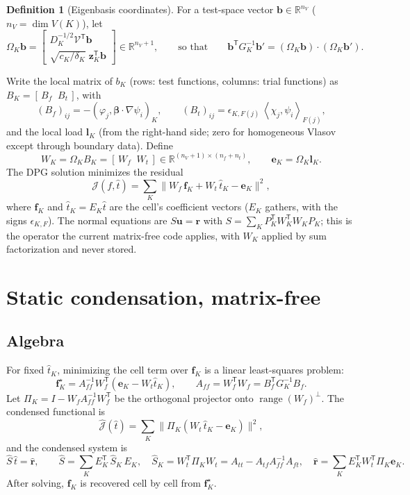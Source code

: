 \documentclass[11pt]{article}
\theoremstyle{remark}
\theoremstyle{definition}
\newtheorem{definition}[proposition]{Definition}
\newcommand{\bbeta}{\boldsymbol{\beta}}
\newcommand{\that}{\hat{t}}
\newcommand{\Shat}{\widehat{S}}
\newcommand{\R}{\mathbb{R}}
\newcommand{\T}{\mathsf{T}}
\newcommand{\ip}[2]{\left(#1,#2\right)}
\newcommand{\dual}[2]{\left\langle #1,#2\right\rangle}
\begin{document}
\begin{definition}[Eigenbasis coordinates]
For a test-space vector $\mathbf b\in\R^{n_V}$ ($n_V=\dim V(K)$), let
\[
  \Omega_K\mathbf b = \begin{bmatrix} D_K^{-1/2}\mathcal V^\T\mathbf b \\ \sqrt{c_K/\delta_K}\;\mathbf z_K^\T\mathbf b\end{bmatrix}
  \in\R^{n_V+1},
  \qquad\text{so that}\qquad \mathbf b^\T G_K^{-1}\mathbf b' = (\Omega_K\mathbf b)\cdot(\Omega_K\mathbf b').
\]
\end{definition}

Write the local matrix of $b_K$ (rows: test functions, columns: trial functions) as
$B_K = [\,B_{f}\;\;B_{t}\,]$, with
\[
  (B_f)_{ij} = -\ip{\varphi_j}{\bbeta\cdot\nabla\psi_i}_K,\qquad
  (B_t)_{ij} = \epsilon_{K,F(j)}\,\dual{\chi_j}{\psi_i}_{F(j)},
\]
and the local load $\mathbf l_K$ (from the right-hand side; zero for homogeneous Vlasov except through boundary data).
Define
\[
  W_K = \Omega_K B_K = [\,W_f\;\;W_t\,]\in\R^{(n_V+1)\times(n_f+n_t)},\qquad \mathbf e_K = \Omega_K\mathbf l_K.
\]
The DPG solution minimizes the residual
\[
  \mathcal J(f,\that) = \sum_K \bigl\| W_f\,\mathbf f_K + W_t\,\that_K - \mathbf e_K\bigr\|^2 ,
\]
where $\mathbf f_K$ and $\that_K = E_K\that$ are the cell's coefficient vectors ($E_K$ gathers, with the signs
$\epsilon_{K,F}$).  The normal equations are $S\mathbf u=\mathbf r$ with $S=\sum_K P_K^\T W_K^\T W_K P_K$; this is the
operator the current matrix-free code applies, with $W_K$ applied by sum factorization and never stored.

\section{Static condensation, matrix-free}

\subsection{Algebra}

For fixed $\that_K$, minimizing the cell term over $\mathbf f_K$ is a linear least-squares problem:
\[
  \mathbf f_K^\star = A_{ff}^{-1}W_f^\T(\mathbf e_K - W_t\that_K),\qquad A_{ff}=W_f^\T W_f = B_f^\T G_K^{-1}B_f.
\]
Let $\Pi_K = I - W_f A_{ff}^{-1}W_f^\T$ be the orthogonal projector onto $\operatorname{range}(W_f)^\perp$.  The
condensed functional is
\[
  \widehat{\mathcal J}(\that) = \sum_K \bigl\|\Pi_K(W_t\,\that_K - \mathbf e_K)\bigr\|^2,
\]
and the condensed system is
\begin{equation}\label{eq:condensed}
  \Shat\,\that = \hat{\mathbf r},\qquad
  \Shat = \sum_K E_K^\T\,\Shat_K\,E_K,\quad \Shat_K = W_t^\T\Pi_K W_t = A_{tt} - A_{tf}A_{ff}^{-1}A_{ft},\quad
  \hat{\mathbf r} = \sum_K E_K^\T W_t^\T\Pi_K\mathbf e_K .
\end{equation}
After solving, $\mathbf f_K$ is recovered cell by cell from $\mathbf f_K^\star$.
\end{document}
